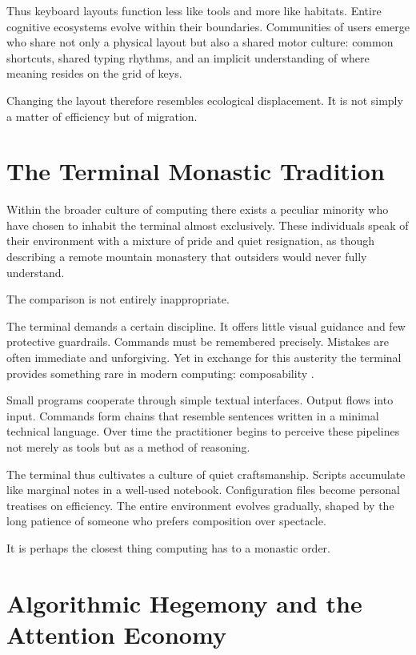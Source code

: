\documentclass[11pt]{article}
\theoremstyle{definition}
\begin{document}
Thus keyboard layouts function less like tools and more like habitats.
Entire cognitive ecosystems evolve within their boundaries. Communities
of users emerge who share not only a physical layout but also a shared
motor culture: common shortcuts, shared typing rhythms, and an implicit
understanding of where meaning resides on the grid of keys.

Changing the layout therefore resembles ecological displacement. It is
not simply a matter of efficiency but of migration.

\section{The Terminal Monastic Tradition}

Within the broader culture of computing there exists a peculiar minority
who have chosen to inhabit the terminal almost exclusively. These
individuals speak of their environment with a mixture of pride and quiet
resignation, as though describing a remote mountain monastery that
outsiders would never fully understand.

The comparison is not entirely inappropriate.

The terminal demands a certain discipline. It offers little visual
guidance and few protective guardrails. Commands must be remembered
precisely. Mistakes are often immediate and unforgiving. Yet in
exchange for this austerity the terminal provides something rare in
modern computing: composability \cite{raymond2003,mcilroy1978}.

Small programs cooperate through simple textual interfaces. Output flows
into input. Commands form chains that resemble sentences written in a
minimal technical language. Over time the practitioner begins to perceive
these pipelines not merely as tools but as a method of reasoning.

The terminal thus cultivates a culture of quiet craftsmanship. Scripts
accumulate like marginal notes in a well-used notebook. Configuration
files become personal treatises on efficiency. The entire environment
evolves gradually, shaped by the long patience of someone who prefers
composition over spectacle.

It is perhaps the closest thing computing has to a monastic order.

\section{Algorithmic Hegemony and the Attention Economy}
\end{document}

